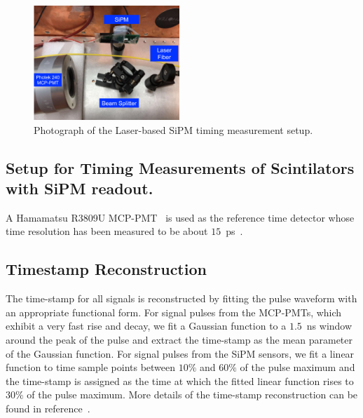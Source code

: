 \begin{figure}[htbp] 
\centering
\includegraphics[width=0.49\textwidth]{figures/SiPMSetup1.pdf} 
\caption{Photograph of the Laser-based SiPM timing measurement setup.} 
\label{fig:laserSetup} 
\end{figure} 

\subsection{Setup for Timing Measurements of Scintilators with SiPM readout.}

A Hamamatsu R3809U MCP-PMT~\cite{HamaMCPDataSheet} is used as the reference time 
detector whose time resolution has been measured to be about $15$~ps~\cite{Anderson:2015gha}.


\subsection{Timestamp Reconstruction}

The time-stamp for all signals is reconstructed by fitting the pulse waveform
with an appropriate functional form. For signal pulses from the MCP-PMTs, which
exhibit a very fast rise and decay, we fit a Gaussian function to a $1.5$~ns
window around the peak of the pulse and extract the time-stamp as the mean
parameter of the Gaussian function. For signal pulses from the SiPM sensors, we
fit a linear function to time sample points between $10\%$ and $60\%$ of the
pulse maximum and the time-stamp is assigned as the time at which the fitted
linear function rises to $30\%$ of the pulse maximum. More details of the
time-stamp reconstruction can be found in reference~\cite{Anderson:2015gha}.
